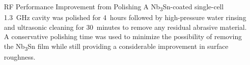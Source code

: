 \documentclass{beamer}
\begin{document}
\begin{frame}{}
\begin{columns}[t]
            \begin{column}{0.32\textwidth}
                \begin{block}{\label{sec:cavitycbp}RF Performance Improvement from Polishing}
                    A Nb\textsubscript{3}Sn-coated single-cell 1.3~GHz cavity was polished for 4~hours followed by high-pressure water rinsing and ultrasonic cleaning for 30~minutes to remove any residual abrasive material. A conservative polishing time was used to minimize the possibility of removing the Nb\textsubscript{3}Sn film while still providing a considerable improvement in surface roughness.
                    \begin{columns}
                        \begin{column}{0.5\columnwidth}
                            \begin{figure}[t]
                                \centering

\end{figure}
\end{column}
\end{columns}
\end{block}
\end{column}
\end{columns}
\end{frame}
\end{document}
